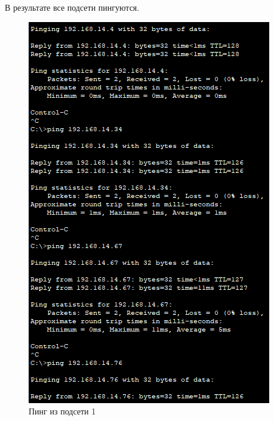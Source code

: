 \documentclass[12pt, a4paper]{extarticle}
\begin{document}
В результате все подсети пингуются.
\begin{figure}[H]
	\centering
	\includegraphics[scale=0.9]{images/ping.png}
	\caption{Пинг из подсети 1}
\end{figure}
\end{document}
